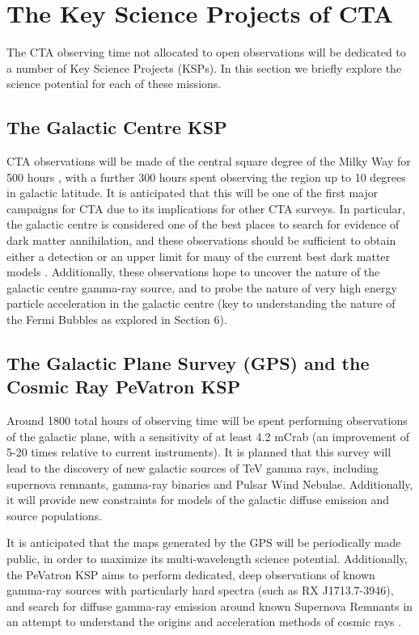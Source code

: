\section{The Key Science Projects of CTA}
The CTA observing time not allocated to open observations will be dedicated to a number of Key Science Projects (KSPs). In this section we briefly explore the science potential for each of these missions.

\subsection{The Galactic Centre KSP}
CTA observations will be made of the central square degree of the Milky Way for 500 hours \cite{scienceCTA}, with a further 300 hours spent observing the region up to 10 degrees in galactic latitude. It is anticipated that this will be one of the first major campaigns for CTA due to its implications for other CTA surveys.
In particular, the galactic centre is considered one of the best places to search for evidence of dark matter annihilation, and these observations should be sufficient to obtain either a detection or an upper limit for many of the current best dark matter models \cite{scienceCTA}. Additionally, these observations hope to uncover the nature of the galactic centre gamma-ray source, and to probe the nature of very high energy particle acceleration in the galactic centre (key to understanding the nature of the Fermi Bubbles as explored in Section 6). 

\subsection{The Galactic Plane Survey (GPS) and the Cosmic Ray PeVatron KSP}
Around 1800 total hours of observing time will be spent performing observations of the galactic plane, with a sensitivity of at least 4.2 mCrab \cite{scienceCTA} (an improvement of 5-20 times relative to current instruments). It is planned that this survey will lead to the discovery of new galactic sources of TeV gamma rays, including supernova remnants, gamma-ray binaries and Pulsar Wind Nebulae. Additionally, it will provide new constraints for models of the galactic diffuse emission and source populations. 

It is anticipated that the maps generated by the GPS will be periodically made public, in order to maximize its multi-wavelength science potential.
Additionally, the PeVatron KSP aims to perform dedicated, deep observations of known gamma-ray sources with particularly hard spectra (such as RX J1713.7-3946), and search for diffuse gamma-ray emission around known Supernova Remnants in an attempt to understand the origins and acceleration methods of cosmic rays \cite{scienceCTA}.

